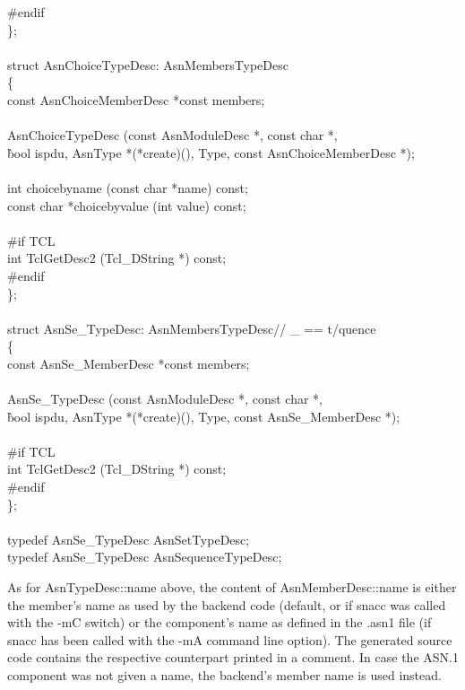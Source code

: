 \begin{Ccode}
\#endif\\
\};\\
\\
struct AsnChoiceTypeDesc: AsnMembersTypeDesc\\
\{\+\\
  const AsnChoiceMemberDesc	\>\>*const members;\\
\\
				\>\>AsnChoiceTypeDesc (const AsnModuleDesc *, const char *,\\
					\`bool ispdu, AsnType *(*create)(), Type, const AsnChoiceMemberDesc *);\\
\\
  int				\>\>choicebyname (const char *name) const;\\
  const char			\>\>*choicebyvalue (int value) const;\\
\\
\<\#if TCL\\
  int				\>\>TclGetDesc2 (Tcl\_DString *) const;\-\\
\#endif\\
\};\\
\\
struct AsnSe\_TypeDesc: AsnMembersTypeDesc\qquad// \_ == t/quence\\
\{\+\\
  const AsnSe\_MemberDesc	\>\>*const members;\\
\\
				\>\>AsnSe\_TypeDesc (const AsnModuleDesc *, const char *,\\
					\`bool ispdu, AsnType *(*create)(), Type, const AsnSe\_MemberDesc *);\\
\\
\<\#if TCL\\
  int				\>\>TclGetDesc2 (Tcl\_DString *) const;\-\\
\#endif\\
\};\\
\\
typedef AsnSe\_TypeDesc		\>\>\>AsnSetTypeDesc;\\
typedef AsnSe\_TypeDesc		\>\>\>AsnSequenceTypeDesc;
\end{Ccode}

As for {\C AsnTypeDesc::name} above, the content of {\C AsnMemberDesc::name} is either the member's name as used by the backend code (default, or if snacc was called with the {\ufn -mC} switch) or the component's name as defined in the {\ufn .asn1} file (if snacc has been called with the {\ufn -mA} command line option).
The generated source code contains the respective counterpart printed in a comment.
In case the ASN.1 component was not given a name, the backend's member name is used instead.

